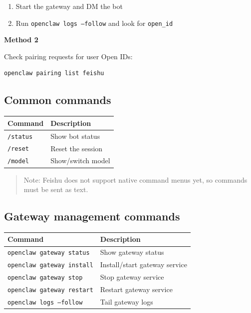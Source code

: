 \begin{enumerate}
  \item Start the gateway and DM the bot
  \item Run \texttt{openclaw logs --follow} and look for \texttt{open\_id}
\end{enumerate}


\textbf{Method 2}

Check pairing requests for user Open IDs:

\begin{lstlisting}[language=bash]
openclaw pairing list feishu
\end{lstlisting}


\hrulefill


\subsection{Common commands}



\begin{table}[h]
\centering
\small
\begin{tabular}{|l|l|}
\hline
Command & Description \\
\hline
\texttt{/status} & Show bot status \\
\hline
\texttt{/reset} & Reset the session \\
\hline
\texttt{/model} & Show/switch model \\
\hline
\end{tabular}
\end{table}



\begin{quote}
Note: Feishu does not support native command menus yet, so commands must be sent as text.
\end{quote}


\subsection{Gateway management commands}



\begin{table}[h]
\centering
\small
\begin{tabular}{|l|l|}
\hline
Command & Description \\
\hline
\texttt{openclaw gateway status} & Show gateway status \\
\hline
\texttt{openclaw gateway install} & Install/start gateway service \\
\hline
\texttt{openclaw gateway stop} & Stop gateway service \\
\hline
\texttt{openclaw gateway restart} & Restart gateway service \\
\hline
\texttt{openclaw logs --follow} & Tail gateway logs \\
\hline
\end{tabular}
\end{table}



